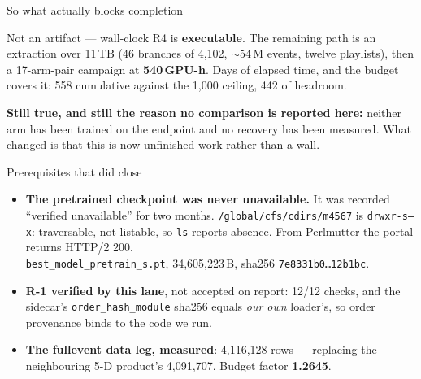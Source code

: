 \documentclass[aspectratio=169,10pt]{beamer}
\begin{document}
\begin{frame}{So what actually blocks completion}
\begin{block}{Not an artifact --- wall-clock}
R4 is \textbf{executable}. The remaining path is an extraction over 11\,TB (46
branches of 4{,}102, ${\sim}54$\,M events, twelve playlists), then a 17-arm-pair
campaign at \textbf{540\,GPU-h}. Days of elapsed time, and the budget covers it:
558 cumulative against the 1{,}000 ceiling, 442 of headroom.
\end{block}
\vfill
\textbf{Still true, and still the reason no comparison is reported here:} neither
arm has been trained on the endpoint and no recovery has been measured. What
changed is that this is now unfinished work rather than a wall.
\end{frame}

\begin{frame}{Prerequisites that did close}
\begin{itemize}
\item \textbf{The pretrained checkpoint was never unavailable.} It was recorded
  ``verified unavailable'' for two months. \texttt{/global/cfs/cdirs/m4567} is
  \texttt{drwxr-s--x}: traversable, not listable, so \texttt{ls} reports absence.
  From Perlmutter the portal returns HTTP/2 200.
  \\[2pt]
  \texttt{best\_model\_pretrain\_s.pt}, 34{,}605{,}223\,B, sha256
  \texttt{7e8331b0\ldots12b1bc}.
\item \textbf{R-1 verified by this lane}, not accepted on report: 12/12 checks,
  and the sidecar's \texttt{order\_hash\_module} sha256 equals \emph{our own}
  loader's, so order provenance binds to the code we run.
\item \textbf{The fullevent data leg, measured}: 4{,}116{,}128 rows --- replacing
  the neighbouring 5-D product's 4{,}091{,}707. Budget factor \textbf{1.2645}.
\end{itemize}
\end{frame}
\end{document}
